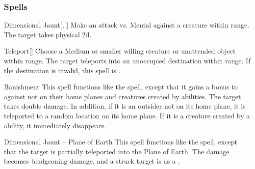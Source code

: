 \subsubsection{Spells}


\lowercase{\hypertarget{spell:Dimensional Jaunt}{}}\label{spell:Dimensional Jaunt}
\begin{ability}[\nth{1}]{\hypertarget{spell:Dimensional Jaunt}{Dimensional Jaunt}}[, ]
Make an attack vs. Mental against a creature within \rngmed range.
\hit The target takes physical  \plus2d.
\end{ability}
\vspace{0.25em}



\lowercase{\hypertarget{spell:Teleport}{}}\label{spell:Teleport}
\begin{ability}[\nth{1}]{\hypertarget{spell:Teleport}{Teleport}}[]
Choose a Medium or smaller willing creature or unattended object within \rngclose range.
The target teleports into an unoccupied destination within range.
If the destination is invalid, this spell is .
\end{ability}
\vspace{0.25em}



\lowercase{\hypertarget{spell:Banishment}{}}\label{spell:Banishment}
\begin{ability}[\nth{2}]{\hypertarget{spell:Banishment}{Banishment}}
This spell functions like the  spell, except that it gains a  bonus to  against  not on their home planes and creatures created by  abilities.
\crit The target takes double damage.
In addition, if it is an outsider not on its home plane, it is teleported to a random location on its home plane.
If it is a creature created by a  ability, it immediately disappears.
\end{ability}
\vspace{0.25em}



\lowercase{\hypertarget{spell:Dimensional Jaunt -- Plane of Earth}{}}\label{spell:Dimensional Jaunt -- Plane of Earth}
\begin{ability}[\nth{2}]{\hypertarget{spell:Dimensional Jaunt -- Plane of Earth}{Dimensional Jaunt -- Plane of Earth}}
This spell functions like the  spell, except that the target is partially teleported into the Plane of Earth.
The damage becomes bludgeoning damage, and a struck target is  as a .
\end{ability}
\vspace{0.25em}



